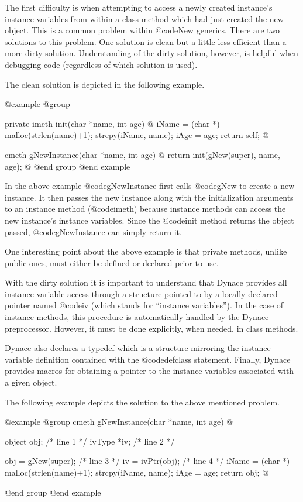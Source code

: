 The first difficulty is when attempting to access a newly created instance's
instance variables from within a class method which had just created the
new object.  This is a common problem within @code{New} generics.  There
are two solutions to this problem.  One solution is clean but a little
less efficient than a more dirty solution.  Understanding of the dirty
solution, however, is helpful when debugging code (regardless of which
solution is used).

The clean solution is depicted in the following example.

@example
@group

private imeth  init(char *name, int age)
@{
        iName = (char *) malloc(strlen(name)+1);
        strcpy(iName, name);
        iAge = age;
        return self;
@}

cmeth   gNewInstance(char *name, int age)
@{
        return init(gNew(super), name, age);
@}
@end group
@end example

In the above example @code{gNewInstance} first calls @code{gNew} to
create a new instance.  It then passes the new instance along with the
initialization arguments to an instance method (@code{imeth}) because
instance methods can access the new instance's instance variables.
Since the @code{init} method returns the object passed, @code{gNewInstance}
can simply return it.

One interesting point about the above example is that private methods,
unlike public ones, must either be defined or declared prior to use.

With the dirty solution it is important to understand that Dynace
provides all instance variable access through a structure pointed to
by a locally declared pointer named @code{iv} (which stands for
``instance variables'').  In the case of instance methods, this
procedure is automatically handled by the Dynace preprocessor.
However, it must be done explicitly, when needed, in class methods.

Dynace also declares a typedef which is a structure mirroring the
instance variable definition contained with the @code{defclass}
statement.  Finally, Dynace provides macros for obtaining
a pointer to the instance variables associated with a given object.

The following example depicts the solution to the above mentioned problem.

@example
@group
cmeth   gNewInstance(char *name, int age)
@{
        object  obj;                    /*  line 1  */
        ivType  *iv;                    /*  line 2  */

        obj = gNew(super);              /*  line 3  */
        iv = ivPtr(obj);                /*  line 4  */
        iName = (char *) malloc(strlen(name)+1);
        strcpy(iName, name);
        iAge = age;
        return obj;
@}
@end group
@end example


